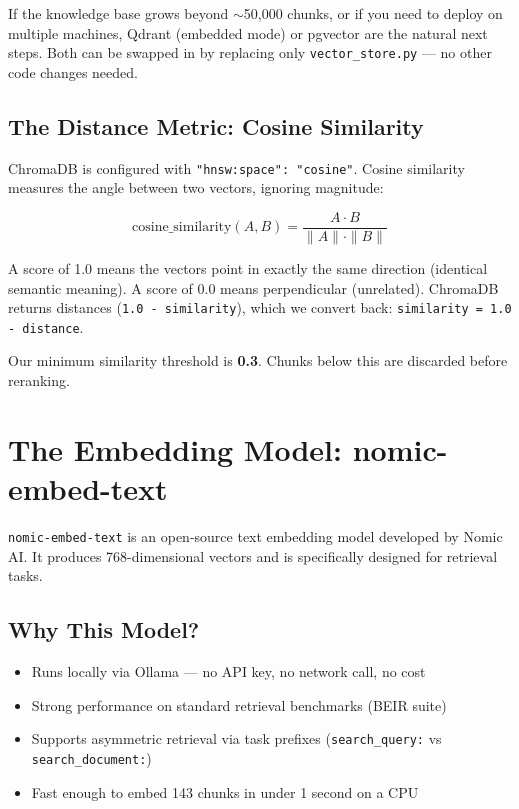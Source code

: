 \documentclass[12pt,letterpaper]{article}
\begin{document}
\begin{infobox}
If the knowledge base grows beyond $\sim$50,000 chunks, or if you need to
deploy on multiple machines, Qdrant (embedded mode) or pgvector are the natural
next steps. Both can be swapped in by replacing only \texttt{vector\_store.py} —
no other code changes needed.
\end{infobox}

\subsection{The Distance Metric: Cosine Similarity}

ChromaDB is configured with \texttt{"hnsw:space": "cosine"}. Cosine similarity
measures the angle between two vectors, ignoring magnitude:

\[
\text{cosine\_similarity}(A, B) = \frac{A \cdot B}{\|A\| \cdot \|B\|}
\]

A score of 1.0 means the vectors point in exactly the same direction (identical
semantic meaning). A score of 0.0 means perpendicular (unrelated). ChromaDB
returns distances (\texttt{1.0 - similarity}), which we convert back:
\texttt{similarity = 1.0 - distance}.

Our minimum similarity threshold is \textbf{0.3}. Chunks below this are
discarded before reranking.

\section{The Embedding Model: nomic-embed-text}

\texttt{nomic-embed-text} is an open-source text embedding model developed by
Nomic AI. It produces 768-dimensional vectors and is specifically designed for
retrieval tasks.

\subsection{Why This Model?}

\begin{itemize}[leftmargin=2em]
  \item Runs locally via Ollama — no API key, no network call, no cost
  \item Strong performance on standard retrieval benchmarks (BEIR suite)
  \item Supports asymmetric retrieval via task prefixes
        (\texttt{search\_query:} vs \texttt{search\_document:})
  \item Fast enough to embed 143 chunks in under 1 second on a CPU
\end{itemize}
\end{document}

